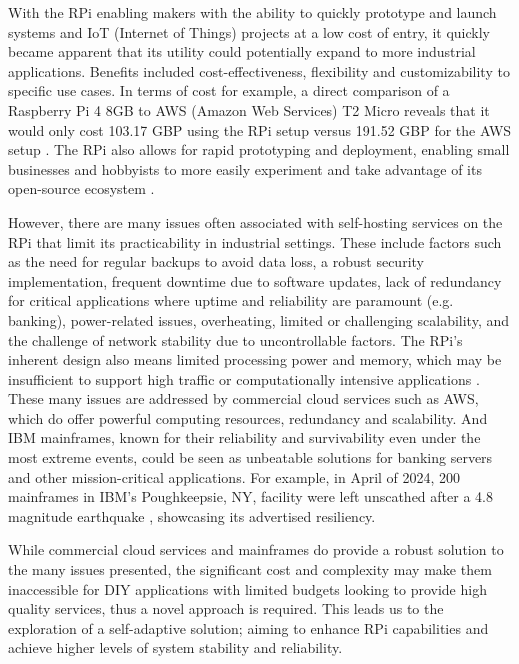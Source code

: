 \documentclass[conference]{IEEEtran}
\begin{document}
With the RPi enabling makers with the ability to quickly prototype and launch systems and IoT (Internet of Things) projects at a low cost of entry, it quickly became apparent that its utility could potentially expand to more industrial applications. Benefits included cost-effectiveness, flexibility and customizability to specific use cases. In terms of cost for example, a direct comparison of a Raspberry Pi 4 8GB to AWS (Amazon Web Services) T2 Micro reveals that it would only cost 103.17 GBP using the RPi setup versus 191.52 GBP for the AWS setup \cite{pi_vs_AWS}. The RPi also allows for rapid prototyping and deployment, enabling small businesses and hobbyists to more easily experiment and take advantage of its open-source ecosystem \cite{pi_history}.

However, there are many issues often associated with self-hosting services on the RPi that limit its practicability in industrial settings. These include factors such as the need for regular backups to avoid data loss, a robust security implementation, frequent downtime due to software updates, lack of redundancy for critical applications where uptime and reliability are paramount (e.g. banking), power-related issues, overheating, limited or challenging scalability, and the challenge of network stability due to uncontrollable factors. The RPi's inherent design also means limited processing power and memory, which may be insufficient to support high traffic or computationally intensive applications \cite{pi_headaches,pi_website_hosting}. These many issues are addressed by commercial cloud services such as AWS, which do offer powerful computing resources, redundancy and scalability. And IBM mainframes, known for their reliability and survivability even under the most extreme events, could be seen as unbeatable solutions for banking servers and other mission-critical applications. For example, in April of 2024, 200 mainframes in IBM's Poughkeepsie, NY, facility were left unscathed after a 4.8 magnitude earthquake \cite{IBM_mainframes}, showcasing its advertised resiliency.

While commercial cloud services and mainframes do provide a robust solution to the many issues presented, the significant cost and complexity may make them inaccessible for DIY applications with limited budgets looking to provide high quality services, thus a novel approach is required. This leads us to the exploration of a self-adaptive solution; aiming to enhance RPi capabilities and achieve higher levels of system stability and reliability.
\end{document}
